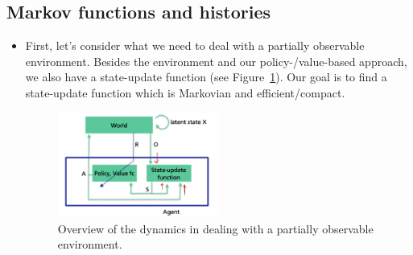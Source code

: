 \subsection{Markov functions and histories}
\begin{itemize}
	\item First, let's consider what we need to deal with a partially observable environment. Besides the environment and our policy-/value-based approach, we also have a state-update function (see Figure~\ref{fig:rl_partially_observability_architecture}). Our goal is to find a state-update function which is Markovian and efficient/compact.
	
	\begin{figure}[ht!]
		\centering
		\includegraphics[width=0.5\textwidth]{figures/rl_partially_observability_architecture.png}
		\caption{Overview of the dynamics in dealing with a partially observable environment.}
		\label{fig:rl_partially_observability_architecture}
	\end{figure}
\end{itemize}
